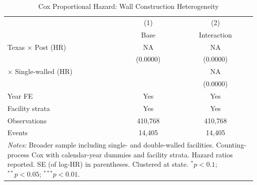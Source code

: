 \begin{table}[htbp]\centering
\caption{Cox Proportional Hazard: Wall Construction Heterogeneity}
\label{tbl:cox_wall}
\begin{tabular}{lcc}\toprule
 & (1) & (2) \\
 & Base & Interaction \\\midrule
Texas $\times$ Post (HR) & NA & NA \\
 & (0.0000) & (0.0000) \\
$\times$ Single-walled (HR) & & NA \\
 & & (0.0000) \\
\midrule
Year FE & Yes & Yes \\
Facility strata & Yes & Yes \\
Observations & 410,768 & 410,768 \\
Events & 14,405 & 14,405 \\
\bottomrule
\multicolumn{3}{p{0.85\textwidth}}{\footnotesize \textit{Notes:} 
Broader sample including single- and double-walled facilities. 
Counting-process Cox with calendar-year dummies and facility strata. 
Hazard ratios reported. SE (of log-HR) in parentheses. 
Clustered at state. $^{*}p<0.1$; $^{**}p<0.05$; $^{***}p<0.01$.}
\end{tabular}\end{table}
